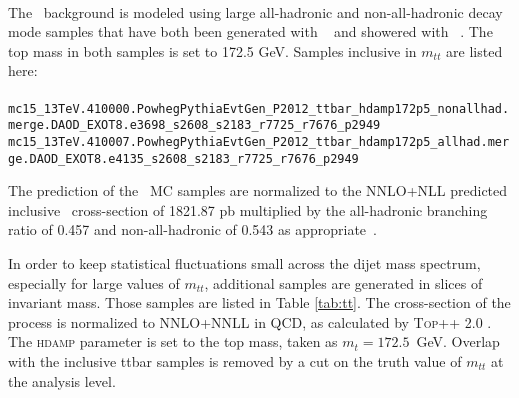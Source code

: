 \paragraph{}
The \ttbar\ background is modeled using large all-hadronic and non-all-hadronic decay mode samples that have both been generated with \Powheg~\cite{powheg} and showered with \Pythia~\cite{pythia8}. The top mass in both samples is set to 172.5 GeV. Samples inclusive in $m_{tt}$ are listed here:
\\ \\
\noindent
{\scriptsize
\verb|mc15_13TeV.410000.PowhegPythiaEvtGen_P2012_ttbar_hdamp172p5_nonallhad.merge.DAOD_EXOT8.e3698_s2608_s2183_r7725_r7676_p2949|\\
\verb|mc15_13TeV.410007.PowhegPythiaEvtGen_P2012_ttbar_hdamp172p5_allhad.merge.DAOD_EXOT8.e4135_s2608_s2183_r7725_r7676_p2949|
}

The prediction of the \ttbar\ MC samples are normalized to the NNLO+NLL predicted inclusive \ttbar\ cross-section of
1821.87 pb multiplied by the all-hadronic branching ratio of 0.457 and non-all-hadronic of 0.543 as appropriate~\cite{TTbarXSec}. 

In order to keep statistical fluctuations small across the dijet mass spectrum, especially for large values of $m_{tt}$, additional \ttbar samples are generated in slices of \ttbar invariant mass. Those samples are listed in Table \ref{tab:tt}. The cross-section of the \ttbar process is normalized to NNLO+NNLL in QCD, as calculated by \textsc{Top++} 2.0 \cite{Czakon:2011xx}. The \POWHEG \textsc{hdamp} parameter \cite{ATL-PHYS-PUB-2014-005} is set to the top mass, taken as $m_{t} = 172.5$~GeV. Overlap with the inclusive ttbar samples is removed by a cut on the truth value of $m_{tt}$ at the analysis level.
 
